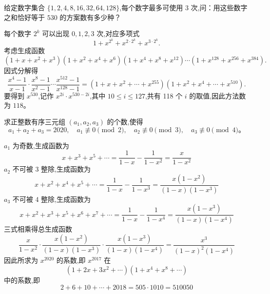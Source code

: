 \begin{questions}
    \question 给定数字集合 $\{1, 2, 4, 8, 16, 32, 64, 128\}$,每个数字最多可使用 $3$ 次,问：用这些数字之和恰好等于 $530$ 的方案数有多少种？
    \begin{solution}
        每个数字 $2^k$ 可以出现 $0,1,2,3$ 次,对应多项式
        \[
        1 + x^{2^k} + x^{2\cdot 2^k} + x^{3\cdot 2^k}.
        \]
        考虑生成函数
        \[
        (1+x+x^2+x^3)(1+x^2+x^4+x^6)(1+x^4+x^8+x^{12}) \cdots (1+x^{128}+x^{256}+x^{384}).
        \]
        因式分解得
        \[
        \frac{x^4-1}{x-1}\cdot\frac{x^8-1}{x^2-1}\cdots \frac{x^{512}-1}{x^{128}-1}
        = (1+x+x^2+\cdots+x^{255})(1+x^2+x^4+\cdots+x^{510}).
        \]
        要得到 $x^{530}$,记作 $x^{2i}\cdot x^{530-2i}$,其中 $10 \le i \le 127$,共有 118 个 $i$ 的取值,因此方法数为 $118$。
    \end{solution}

    \question 求正整数有序三元组 $(a_1, a_2, a_3)$ 的个数,使得
    \[
    a_1 + a_2 + a_3 = 2020, \quad a_1 \not\equiv 0 \pmod 2, \quad a_2 \not\equiv 0 \pmod 3, \quad a_3 \not\equiv 0 \pmod 4。
    \]
    \begin{solution}
        $a_1$ 为奇数,生成函数为
        \[
        x + x^3 + x^5 + \cdots = \frac{1}{1-x} - \frac{1}{1-x^2} = \frac{x}{1-x^2}
        \]
        $a_2$ 不可被 3 整除,生成函数为
        \[
        x + x^2 + x^4 + x^5 + \cdots = \frac{1}{1-x} - \frac{1}{1-x^3} = \frac{x(1-x^2)}{(1-x)(1-x^3)}
        \]
        $a_3$ 不可被 4 整除,生成函数为
        \[
        x + x^2 + x^3 + x^5 + x^6 + x^7 + \cdots = \frac{1}{1-x} - \frac{1}{1-x^4} = \frac{x(1-x^3)}{(1-x)(1-x^4)}
        \]
        三式相乘得总生成函数
        \[
        \frac{x}{1-x^2} \cdot \frac{x(1-x^2)}{(1-x)(1-x^3)} \cdot \frac{x(1-x^3)}{(1-x)(1-x^4)} = \frac{x^3}{(1-x)^2(1-x^4)}
        \]
        因此所求为 $x^{2020}$ 的系数,即 $x^{2017}$ 在
        \[
        (1 + 2x + 3x^2 + \cdots)(1 + x^4 + x^8 + \cdots)
        \]
        中的系数,即
        \[
        2 + 6 + 10 + \cdots + 2018 = 505 \cdot 1010 = 510050
        \]
    \end{solution}


\end{questions}
